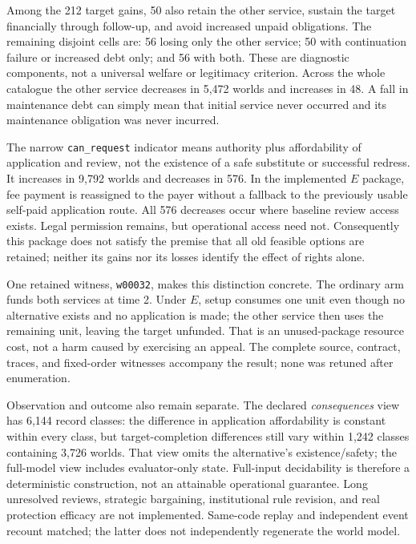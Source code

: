 \documentclass[11pt,a4paper]{article}
\numberwithin{equation}{section}
\theoremstyle{definition}
\theoremstyle{plain}
\theoremstyle{remark}
\begin{document}
Among the 212 target gains, 50 also retain the other service, sustain the target financially through follow-up, and avoid increased unpaid obligations. The remaining disjoint cells are: 56 losing only the other service; 50 with continuation failure or increased debt only; and 56 with both. These are diagnostic components, not a universal welfare or legitimacy criterion. Across the whole catalogue the other service decreases in 5,472 worlds and increases in 48. A fall in maintenance debt can simply mean that initial service never occurred and its maintenance obligation was never incurred.

The narrow \texttt{can\_request} indicator means authority plus affordability of application and review, not the existence of a safe substitute or successful redress. It increases in 9,792 worlds and decreases in 576. In the implemented $E$ package, fee payment is reassigned to the payer without a fallback to the previously usable self-paid application route. All 576 decreases occur where baseline review access exists. Legal permission remains, but operational access need not. Consequently this package does not satisfy the premise that all old feasible options are retained; neither its gains nor its losses identify the effect of rights alone.

One retained witness, \texttt{w00032}, makes this distinction concrete. The ordinary arm funds both services at time 2. Under $E$, setup consumes one unit even though no alternative exists and no application is made; the other service then uses the remaining unit, leaving the target unfunded. That is an unused-package resource cost, not a harm caused by exercising an appeal. The complete source, contract, traces, and fixed-order witnesses accompany the result; none was retuned after enumeration.

Observation and outcome also remain separate. The declared \emph{consequences} view has 6,144 record classes: the difference in application affordability is constant within every class, but target-completion differences still vary within 1,242 classes containing 3,726 worlds. That view omits the alternative's existence/safety; the full-model view includes evaluator-only state. Full-input decidability is therefore a deterministic construction, not an attainable operational guarantee. Long unresolved reviews, strategic bargaining, institutional rule revision, and real protection efficacy are not implemented. Same-code replay and independent event recount matched; the latter does not independently regenerate the world model.
\end{document}
